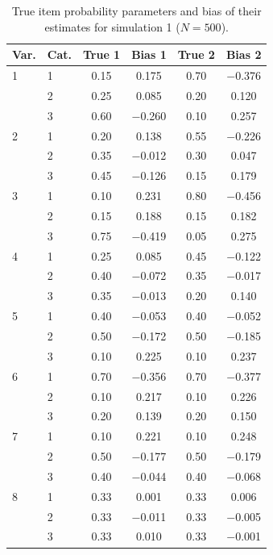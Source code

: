 \begin{table}[H]
\centering
\begin{tabular}{llcccc}
  \toprule
\textbf{Var.} & \textbf{Cat.} & \textbf{True 1} & \textbf{Bias 1} & \textbf{True 2} & \textbf{Bias 2} \\ 
  \midrule
1 & 1 & 0.15 & 0.175 & 0.70 & $-$0.376 \\ 
   & 2 & 0.25 & 0.085 & 0.20 & 0.120 \\ 
   & 3 & 0.60 & $-$0.260 & 0.10 & 0.257 \\ 
  2 & 1 & 0.20 & 0.138 & 0.55 & $-$0.226 \\ 
   & 2 & 0.35 & $-$0.012 & 0.30 & 0.047 \\ 
   & 3 & 0.45 & $-$0.126 & 0.15 & 0.179 \\ 
  3 & 1 & 0.10 & 0.231 & 0.80 & $-$0.456 \\ 
   & 2 & 0.15 & 0.188 & 0.15 & 0.182 \\ 
   & 3 & 0.75 & $-$0.419 & 0.05 & 0.275 \\ 
  4 & 1 & 0.25 & 0.085 & 0.45 & $-$0.122 \\ 
   & 2 & 0.40 & $-$0.072 & 0.35 & $-$0.017 \\ 
   & 3 & 0.35 & $-$0.013 & 0.20 & 0.140 \\ 
  5 & 1 & 0.40 & $-$0.053 & 0.40 & $-$0.052 \\ 
   & 2 & 0.50 & $-$0.172 & 0.50 & $-$0.185 \\ 
   & 3 & 0.10 & 0.225 & 0.10 & 0.237 \\ 
  6 & 1 & 0.70 & $-$0.356 & 0.70 & $-$0.377 \\ 
   & 2 & 0.10 & 0.217 & 0.10 & 0.226 \\ 
   & 3 & 0.20 & 0.139 & 0.20 & 0.150 \\ 
  7 & 1 & 0.10 & 0.221 & 0.10 & 0.248 \\ 
   & 2 & 0.50 & $-$0.177 & 0.50 & $-$0.179 \\ 
   & 3 & 0.40 & $-$0.044 & 0.40 & $-$0.068 \\ 
  8 & 1 & 0.33 & 0.001 & 0.33 & 0.006 \\ 
   & 2 & 0.33 & $-$0.011 & 0.33 & $-$0.005 \\ 
   & 3 & 0.33 & 0.010 & 0.33 & $-$0.001 \\ 
   \bottomrule
\end{tabular}
\caption{True item probability parameters and bias of their estimates for simulation 1 ($N = 500$).} 
\label{table:sim1_item_prob_bias_N500}
\end{table}

